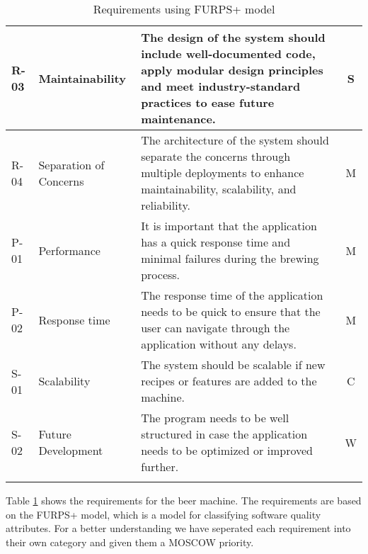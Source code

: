 \begin{center}
\begin{longtable}{|p{1cm}|p{4cm}|p{8.5cm}|c|}
        R-03   & Maintainability            & The design of the system should include well-documented code, apply modular design principles and meet industry-standard practices to ease future maintenance.      & S \\ \hline 
        R-04   & Separation of Concerns     & The architecture of the system should separate the concerns through multiple deployments to enhance maintainability, scalability, and reliability.             & M \\ \hline
        P-01   & Performance                & It is important that the application has a quick response time and minimal failures during the brewing process.                                                & M \\ \hline
        P-02   & Response time              & The response time of the application needs to be quick to ensure that the user can navigate through the application without any delays.                            & M \\ \hline
        S-01   & Scalability                & The system should be scalable if new recipes or features are added to the machine.                                                                  & C \\ \hline
        S-02   & Future Development         & The program needs to be well structured in case the application needs to be optimized or improved further.                                                     & W \\ \hline

        \caption{Requirements using FURPS+ model}
        \label{tab:requirements}
    \end{longtable}
\end{center}

Table \ref{tab:requirements} shows the requirements for the beer machine. The requirements are based on the FURPS+ model, which is a model for classifying software quality attributes. For a better understanding we have seperated each requirement into their own category and given them a MOSCOW priority.







